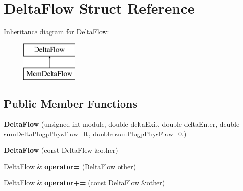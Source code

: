 \hypertarget{structDeltaFlow}{}\section{Delta\+Flow Struct Reference}
\label{structDeltaFlow}
Inheritance diagram for Delta\+Flow\+:\begin{figure}[H]
\begin{center}
\leavevmode
\includegraphics[height=2.000000cm]{structDeltaFlow}
\end{center}
\end{figure}
\subsection*{Public Member Functions}
\begin{DoxyCompactItemize}
\item 
\mbox{\label{structDeltaFlow_a30df5aa23204363c4ef4863d6224a9c6}} 
{\bfseries Delta\+Flow} (unsigned int module, double delta\+Exit, double delta\+Enter, double sum\+Delta\+Plogp\+Phys\+Flow=0., double sum\+Plogp\+Phys\+Flow=0.)
\item 
\mbox{\label{structDeltaFlow_acd48168291609aaf90db35ba3a81794f}} 
{\bfseries Delta\+Flow} (const \mbox{\hyperlink{structDeltaFlow}{Delta\+Flow}} \&other)
\item 
\mbox{\label{structDeltaFlow_a072378f25898e48cdb5657f2e1874439}} 
\mbox{\hyperlink{structDeltaFlow}{Delta\+Flow}} \& {\bfseries operator=} (\mbox{\hyperlink{structDeltaFlow}{Delta\+Flow}} other)
\item 
\mbox{\label{structDeltaFlow_ae4c92bbab4cc22d5c4f4a06b68037110}} 
\mbox{\hyperlink{structDeltaFlow}{Delta\+Flow}} \& {\bfseries operator+=} (const \mbox{\hyperlink{structDeltaFlow}{Delta\+Flow}} \&other)
\end{DoxyCompactItemize}
